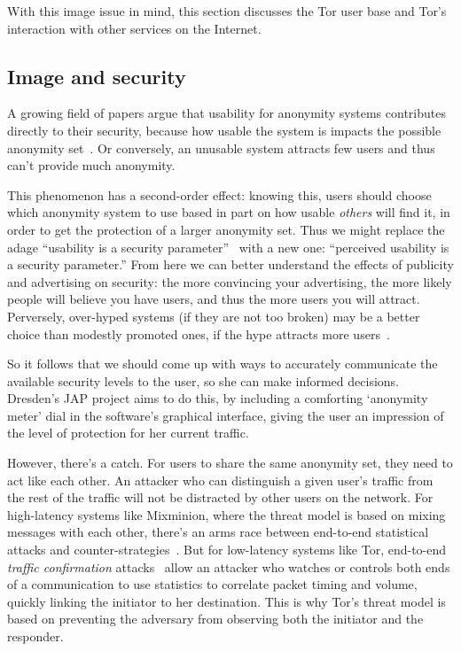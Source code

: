 \documentclass{llncs}
\begin{document}
With this image issue in mind, this section discusses the Tor user base and
Tor's interaction with other services on the Internet.

\subsection{Image and security}

A growing field of papers argue that usability for anonymity systems
contributes directly to their security, because how usable the system
is impacts the possible anonymity set~\cite{back01,econymics}. Or
conversely, an unusable system attracts few users and thus can't provide
much anonymity.

This phenomenon has a second-order effect: knowing this, users should
choose which anonymity system to use based in part on how usable
\emph{others} will find it, in order to get the protection of a larger
anonymity set. Thus we might replace the adage ``usability is a security
parameter''~\cite{back01} with a new one: ``perceived usability is a
security parameter.'' From here we can better understand the effects
of publicity and advertising on security: the more convincing your
advertising, the more likely people will believe you have users, and thus
the more users you will attract. Perversely, over-hyped systems (if they
are not too broken) may be a better choice than modestly promoted ones,
if the hype attracts more users~\cite{usability-network-effect}.

So it follows that we should come up with ways to accurately communicate
the available security levels to the user, so she can make informed
decisions. Dresden's JAP project aims to do this, by including a
comforting `anonymity meter' dial in the software's graphical interface,
giving the user an impression of the level of protection for her current
traffic.

However, there's a catch. For users to share the same anonymity set,
they need to act like each other. An attacker who can distinguish
a given user's traffic from the rest of the traffic will not be
distracted by other users on the network. For high-latency systems like
Mixminion, where the threat model is based on mixing messages with each
other, there's an arms race between end-to-end statistical attacks and
counter-strategies~\cite{statistical-disclosure,minion-design,e2e-traffic,trickle02}.
But for low-latency systems like Tor, end-to-end \emph{traffic
confirmation} attacks~\cite{danezis-pet2004,SS03,defensive-dropping}
allow an attacker who watches or controls both ends of a communication
to use statistics to correlate packet timing and volume, quickly linking
the initiator to her destination. This is why Tor's threat model is
based on preventing the adversary from observing both the initiator and
the responder.
\end{document}
